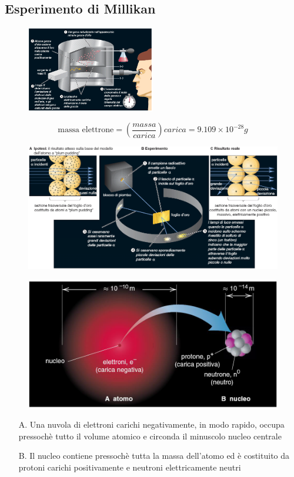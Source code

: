 \documentclass[a4paper,11pt]{report}
\begin{document}
\subsection*{Esperimento di Millikan}
\begin{figure}[H]
	\centering
	\includegraphics[width=0.5\textwidth,height=\textheight,keepaspectratio]{immagini/Millikan}
	\label{fig:millikan}
\end{figure}
\[\text{massa elettrone} = \left(\frac{massa}{carica}\right)carica = 9.109 \times 10^{-28}g  \]
\begin{figure}[H]
	\centering
	\includegraphics[width=\textwidth,height=\textheight,keepaspectratio]{immagini/atomo}
	\caption{}
	\label{fig:atomo}
\end{figure}
\begin{figure}[H]
	\centering
	\includegraphics[width=0.5\linewidth, height=\textheight,keepaspectratio]{immagini/atomo1}
	\label{fig:atomo1}
\end{figure}
\begin{itemize}
	\item [A.] Una nuvola di elettroni carichi negativamente, in modo rapido, occupa pressochè tutto il volume atomico e circonda il minuscolo nucleo centrale
	\item [B.] Il nucleo contiene pressochè tutta la massa dell'atomo ed è costituito da protoni carichi positivamente e neutroni elettricamente neutri
\end{itemize}
\end{document}
